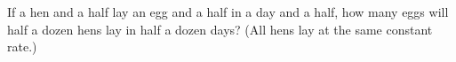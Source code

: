 If a hen and a half lay an egg and a half in a day and a half, how many eggs will half a dozen hens lay in half a dozen days? (All hens lay at the same constant rate.)
